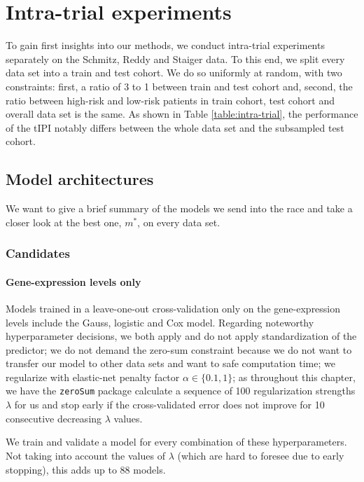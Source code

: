 \section{Intra-trial experiments}\label{sec:intra-trial}

To gain first insights into our methods, we conduct intra-trial experiments separately on the 
Schmitz, Reddy and Staiger data. To this end, we split every data set into a train and test 
cohort. We do so uniformly at random, with two constraints: first, a ratio of 3 to 1 between train 
and test cohort and, second, the ratio between high-risk and low-risk patients in train cohort, 
test cohort and overall data set is the same. As shown in Table \ref{table:intra-trial}, the 
performance of the tIPI notably differs between the whole data set and the subsampled test cohort. 



\subsection{Model architectures}

We want to give a brief summary of the models we send into the race and take a closer look at the 
best one, $m^*$, on every data set.

\subsubsection{Candidates}

\paragraph{Gene-expression levels only}
Models trained in a leave-one-out cross-validation only on the gene-expression levels include the 
Gauss, logistic and Cox model. Regarding noteworthy hyperparameter decisions, we both apply and 
do not apply standardization of the predictor; we do not demand the zero-sum constraint 
because we do not want to transfer our model to other data sets and want to safe computation time;
we regularize with elastic-net penalty factor $\alpha \in \{ \num{0.1}, 1 \}$; as throughout this 
chapter, we have the \texttt{zeroSum} package calculate a sequence of \num{100} regularization strengths 
$\lambda$ for us and stop early if the cross-validated error does not improve for \num{10} 
consecutive decreasing $\lambda$ values.

We train and validate a model for every combination of these hyperparameters.
Not taking into account the values of $\lambda$ (which are hard to foresee due to early stopping), 
this adds up to \num{88} models.


